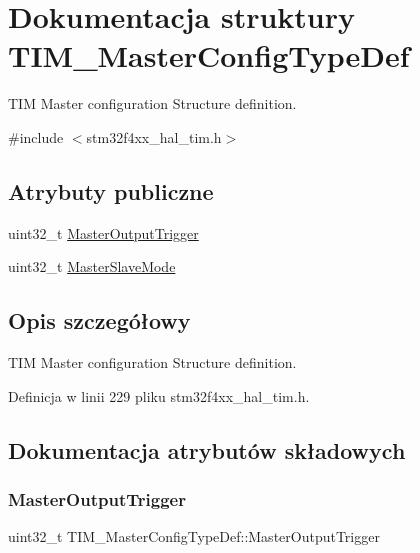 \hypertarget{struct_t_i_m___master_config_type_def}{}\section{Dokumentacja struktury T\+I\+M\+\_\+\+Master\+Config\+Type\+Def}
\label{struct_t_i_m___master_config_type_def}


T\+IM Master configuration Structure definition.  




{\ttfamily \#include $<$stm32f4xx\+\_\+hal\+\_\+tim.\+h$>$}

\subsection*{Atrybuty publiczne}
\begin{DoxyCompactItemize}
\item 
uint32\+\_\+t \hyperlink{struct_t_i_m___master_config_type_def_a908a6c1b46cb203c0b8b59b490e1114e}{Master\+Output\+Trigger}
\item 
uint32\+\_\+t \hyperlink{struct_t_i_m___master_config_type_def_a45ddfca310a1180e19fc24b36f8e9585}{Master\+Slave\+Mode}
\end{DoxyCompactItemize}


\subsection{Opis szczegółowy}
T\+IM Master configuration Structure definition. 

Definicja w linii 229 pliku stm32f4xx\+\_\+hal\+\_\+tim.\+h.



\subsection{Dokumentacja atrybutów składowych}
\mbox{\label{struct_t_i_m___master_config_type_def_a908a6c1b46cb203c0b8b59b490e1114e}} 
\subsubsection{\texorpdfstring{Master\+Output\+Trigger}{MasterOutputTrigger}}
{\footnotesize\ttfamily uint32\+\_\+t T\+I\+M\+\_\+\+Master\+Config\+Type\+Def\+::\+Master\+Output\+Trigger}

